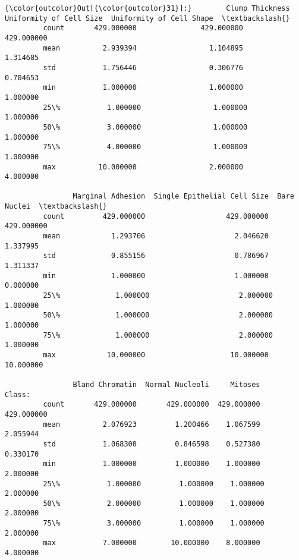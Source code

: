 \documentclass[11pt]{article}
\begin{document}
\begin{Verbatim}[commandchars=\\\{\}]
{\color{outcolor}Out[{\color{outcolor}31}]:}        Clump Thickness  Uniformity of Cell Size  Uniformity of Cell Shape  \textbackslash{}
         count       429.000000               429.000000                429.000000   
         mean          2.939394                 1.104895                  1.314685   
         std           1.756446                 0.306776                  0.704653   
         min           1.000000                 1.000000                  1.000000   
         25\%           1.000000                 1.000000                  1.000000   
         50\%           3.000000                 1.000000                  1.000000   
         75\%           4.000000                 1.000000                  1.000000   
         max          10.000000                 2.000000                  4.000000   
         
                Marginal Adhesion  Single Epithelial Cell Size  Bare Nuclei  \textbackslash{}
         count         429.000000                   429.000000   429.000000   
         mean            1.293706                     2.046620     1.337995   
         std             0.855156                     0.786967     1.311337   
         min             1.000000                     1.000000     0.000000   
         25\%             1.000000                     2.000000     1.000000   
         50\%             1.000000                     2.000000     1.000000   
         75\%             1.000000                     2.000000     1.000000   
         max            10.000000                    10.000000    10.000000   
         
                Bland Chromatin  Normal Nucleoli     Mitoses      Class:  
         count       429.000000       429.000000  429.000000  429.000000  
         mean          2.076923         1.200466    1.067599    2.055944  
         std           1.068300         0.846598    0.527380    0.330170  
         min           1.000000         1.000000    1.000000    2.000000  
         25\%           1.000000         1.000000    1.000000    2.000000  
         50\%           2.000000         1.000000    1.000000    2.000000  
         75\%           3.000000         1.000000    1.000000    2.000000  
         max           7.000000        10.000000    8.000000    4.000000  
\end{Verbatim}
            
\end{document}
